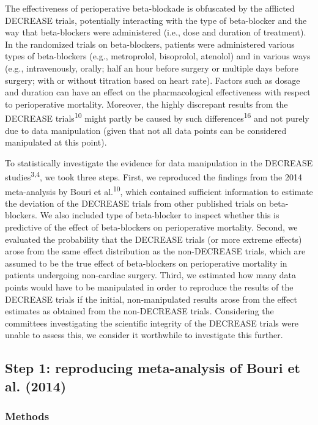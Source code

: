\documentclass[]{article}
\begin{document}
The effectiveness of perioperative beta-blockade is obfuscated by the
afflicted DECREASE trials, potentially interacting with the type of
beta-blocker and the way that beta-blockers were administered (i.e.,
dose and duration of treatment). In the randomized trials on
beta-blockers, patients were administered various types of beta-blockers
(e.g., metroprolol, bisoprolol, atenolol) and in various ways (e.g.,
intravenously, orally; half an hour before surgery or multiple days
before surgery; with or without titration based on heart rate). Factors
such as dosage and duration can have an effect on the pharmacological
effectiveness with respect to perioperative mortality. Moreover, the
highly discrepant results from the DECREASE trials\textsuperscript{10}
might partly be caused by such differences\textsuperscript{16} and not
purely due to data manipulation (given that not all data points can be
considered manipulated at this point).

To statistically investigate the evidence for data manipulation in the
DECREASE studies\textsuperscript{3,4}, we took three steps. First, we
reproduced the findings from the 2014 meta-analysis by Bouri et
al.\textsuperscript{10}, which contained sufficient information to
estimate the deviation of the DECREASE trials from other published
trials on beta-blockers. We also included type of beta-blocker to
inspect whether this is predictive of the effect of beta-blockers on
perioperative mortality. Second, we evaluated the probability that the
DECREASE trials (or more extreme effects) arose from the same effect
distribution as the non-DECREASE trials, which are assumed to be the
true effect of beta-blockers on perioperative mortality in patients
undergoing non-cardiac surgery. Third, we estimated how many data points
would have to be manipulated in order to reproduce the results of the
DECREASE trials if the initial, non-manipulated results arose from the
effect estimates as obtained from the non-DECREASE trials. Considering
the committees investigating the scientific integrity of the DECREASE
trials were unable to assess this, we consider it worthwhile to
investigate this further.

\subsection{Step 1: reproducing meta-analysis of Bouri et al.
(2014)}\label{step-1-reproducing-meta-analysis-of-bouri-et-al.-2014}

\subsubsection{Methods}\label{methods}
\end{document}
